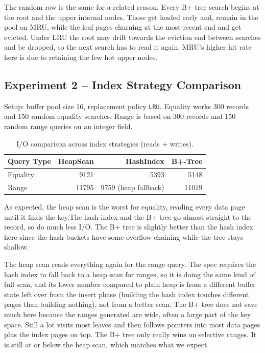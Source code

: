 \documentclass[12pt]{article}
\begin{document}
The random row is the same for a related reason. Every B+ tree
search begins at the root and the upper internal nodes. Those get loaded
early and, remain in the pool on MRU, while the leaf pages
churning at the most-recent end and get evicted. Under LRU the root may drift
towards the eviction end between searches and be dropped, so the next
search has to read it again. MRU’s higher hit rate here is due to retaining the
few hot upper nodes.

\subsection{Experiment 2 -- Index Strategy Comparison}

Setup: buffer pool size 16, replacement policy \texttt{LRU}. Equality works
300 records and 150 random equality searches. Range is based on 300 records and
150 random range queries on an integer field.

\begin{table}[H]
\centering
\caption{I/O comparison across index strategies (reads + writes).}
\begin{tabular}{@{}lrrr@{}}
\toprule
Query Type & HeapScan & HashIndex & B+-Tree \\
\midrule
Equality & 9121  & 5393                & 5148 \\
Range    & 11795 & 9759 (heap fallback) & 11019 \\
\bottomrule
\end{tabular}
\end{table}

As expected, the heap scan is the worst for equality, reading every data page until
it finds the key.The hash index and the B+ tree go almost straight to the record, so do much less I/O. The B+ tree is slightly
better than the hash index here since the hash buckets have some overflow
chaining while the tree stays shallow.

The heap scan reads everything again for the range query. The spec requires 
the hash index to fall back to a heap scan for ranges, so it is doing the 
same kind of full scan, and its lower number compared to plain heap is from a
different buffer state left over from the insert phase (building the hash index 
touches different pages than building nothing), not from a better scan. The 
B+ tree does not save much here because the ranges generated are wide, 
often a large part of the key space. Still a lot visits most leaves and 
then follows pointers into most data pages plus the index pages on top.
The B+ tree only really wins on selective ranges. It is still at or below 
the heap scan, which matches what we expect.
\end{document}
